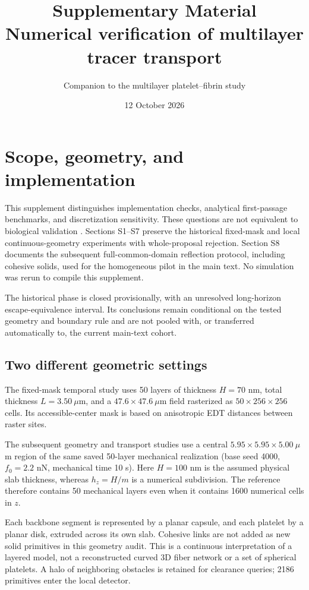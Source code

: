 \documentclass[a4paper,10pt]{article}
\title{\textbf{Supplementary Material}\\[3pt]
Numerical verification of multilayer tracer transport}
\author{Companion to the multilayer platelet--fibrin study}
\date{12 October 2026}
\numberwithin{equation}{section}
\begin{document}
\maketitle
\section{Scope, geometry, and implementation}
This supplement distinguishes implementation checks, analytical first-passage benchmarks, and discretization sensitivity. These questions are not equivalent to biological validation \cite{Slater2021}. Sections S1--S7 preserve the historical fixed-mask and local continuous-geometry experiments with whole-proposal rejection. Section S8 documents the subsequent full-common-domain reflection protocol, including cohesive solids, used for the homogeneous pilot in the main text. No simulation was rerun to compile this supplement.

The historical phase is closed provisionally, with an unresolved long-horizon escape-equivalence interval. Its conclusions remain conditional on the tested geometry and boundary rule and are not pooled with, or transferred automatically to, the current main-text cohort.

\subsection*{Two different geometric settings}
The fixed-mask temporal study uses 50 layers of thickness $H=70$ nm, total thickness $L=3.50~\mu$m, and a $47.6\times47.6~\mu$m field rasterized as $50\times256\times256$ cells. Its accessible-center mask is based on anisotropic EDT distances between raster sites.

The subsequent geometry and transport studies use a central $5.95\times5.95\times5.00~\mu$m region of the same saved 50-layer mechanical realization (base seed 4000, $f_0=2.2$ nN, mechanical time 10 s). Here $H=100$ nm is the assumed physical slab thickness, whereas $h_z=H/m$ is a numerical subdivision. The reference therefore contains 50 mechanical layers even when it contains 1600 numerical cells in $z$.

Each backbone segment is represented by a planar capsule, and each platelet by a planar disk, extruded across its own slab. Cohesive links are not added as new solid primitives in this geometry audit. This is a continuous interpretation of a layered model, not a reconstructed curved 3D fiber network or a set of spherical platelets. A halo of neighboring obstacles is retained for clearance queries; 2186 primitives enter the local detector.
\end{document}
